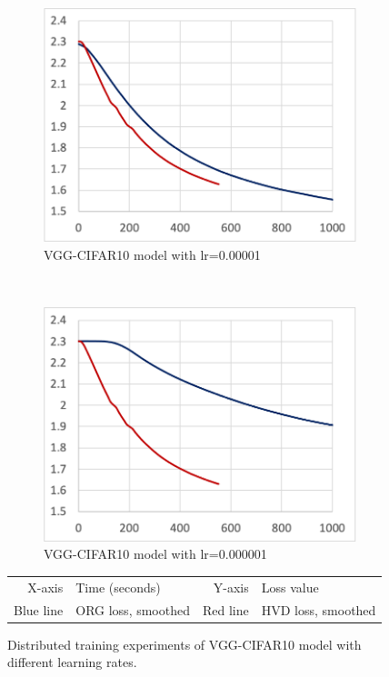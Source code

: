 \begin{figure}[!ht]
\begin{subfigure}[t]{.24\textwidth}
    \includegraphics[width=\textwidth]{cifar-1e5}
    \caption{VGG-CIFAR10 model with lr=0.00001}
  \end{subfigure}
  ~
  \begin{subfigure}[t]{.24\textwidth}
    \includegraphics[width=\textwidth]{cifar-1e6}
    \caption{VGG-CIFAR10 model with lr=0.000001}
  \end{subfigure}

  \caption{Distributed training experiments of VGG-CIFAR10 model with different learning rates.}
  \begin{tabular}{r@{: }l r@{: }l}
    X-axis & Time (seconds) & Y-axis & Loss value\\
    Blue line & ORG loss, smoothed & Red line & HVD loss, smoothed\\ 
  \end{tabular}
\end{figure}


